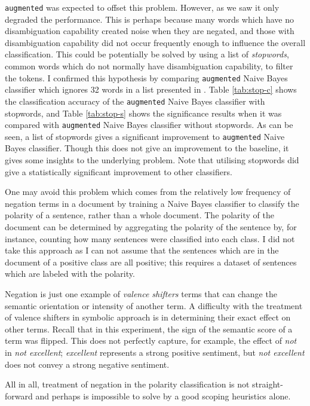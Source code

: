 \texttt{augmented} was expected to offset this problem. However, as we saw it only degraded the performance. This is perhaps because many words which have no disambiguation capability created noise when they are negated, and those with disambiguation capability did not occur frequently enough to influence the overall classification. This could be potentially be solved by using a list of \emph{stopwords}, common words which do not normally have disambiguation capability, to filter the tokens. I confirmed this hypothesis by comparing \texttt{augmented} Naive Bayes classifier which ignores 32 words in a list presented in \cite{stopwords}.  Table \ref{tab:stop-c} shows the classification accuracy of the \texttt{augmented} Naive Bayes classifier with stopwords, and Table \ref{tab:stop-s} shows the significance results when it was compared with \texttt{augmented} Naive Bayes classifier without stopwords. As can be seen, a list of stopwords gives a significant improvement to \texttt{augmented} Naive Bayes classifier. Though this does not give an improvement to the baseline, it gives some insights to the underlying problem. Note that utilising stopwords did give a statistically significant improvement to other classifiers.

One may avoid this problem which comes from the relatively low frequency of negation terms in a document by training a Naive Bayes classifier to classify the polarity of a sentence, rather than a whole document. The polarity of the document can be determined by aggregating the polarity of the sentence by, for instance, counting how many sentences were classified into each class. I did not take this approach as I can not assume that the sentences which are in the document of a positive class are all positive; this requires a dataset of sentences which are labeled with the polarity.

Negation is just one example of \emph{valence shifters} terms that can change the semantic orientation or intensity of another term\cite{kennedy2006sentiment}. A difficulty with the treatment of valence shifters in symbolic approach is in determining their exact effect on other terms\cite{kennedy2006sentiment}. Recall that in this experiment, the sign of the semantic score of a term was flipped. This does not perfectly capture, for example, the effect of \textit{not} in \textit{not excellent}; \textit{excellent} represents a strong positive sentiment, but \textit{not excellent} does not convey a strong negative sentiment.

All in all, treatment of negation in the polarity classification is not straight-forward and perhaps is impossible to solve by a good scoping heuristics alone. 

